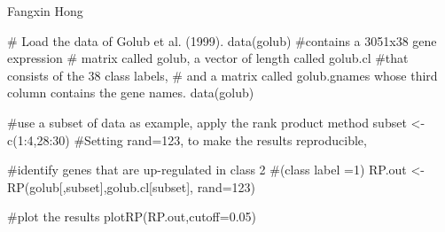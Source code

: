 \begin{Author}\relax
Fangxin Hong 
\end{Author}
\begin{SeeAlso}\relax
{}     
 
\end{SeeAlso}
\begin{Examples}
\begin{ExampleCode}
     
      # Load the data of Golub et al. (1999). data(golub) 
      #contains a 3051x38 gene expression
      # matrix called golub, a vector of length called golub.cl 
      #that consists of the 38 class labels,
      # and a matrix called golub.gnames whose third column contains the gene names.
      data(golub)
 
      #use a subset of data as example, apply the rank product method
      subset <- c(1:4,28:30)
      #Setting rand=123, to make the results reproducible,

      #identify genes that are up-regulated in class 2 
      #(class label =1)
      RP.out <- RP(golub[,subset],golub.cl[subset], rand=123)
      
      #plot the results
      plotRP(RP.out,cutoff=0.05)
      
\end{ExampleCode}
\end{Examples}


